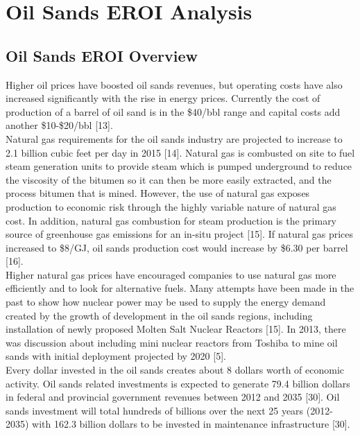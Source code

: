 \documentclass[12pt]{article}
\begin{document}
\section{Oil Sands EROI Analysis}

\subsection{Oil Sands EROI Overview}

Higher oil prices have boosted oil sands revenues, but operating costs have also increased significantly with the rise in energy prices. Currently the cost of production of a barrel of oil sand is in the \$40/bbl range and capital costs add another \$10-\$20/bbl [13].\\

Natural gas requirements for the oil sands industry are projected to increase to 2.1 billion cubic feet per day in 2015 [14]. Natural gas is combusted on site to fuel steam generation units to provide steam which is pumped underground to reduce the viscosity of the bitumen so it can then be more easily extracted, and the process bitumen that is mined. However, the use of natural gas exposes production to economic risk through the highly variable nature of natural gas cost. In addition, natural gas combustion for steam production is the primary source of greenhouse gas emissions for an in-situ project [15]. If natural gas prices increased to \$8/GJ, oil sands production cost would increase by \$6.30 per barrel [16].\\ 

Higher natural gas prices have encouraged companies to use natural gas more efficiently and to look for alternative fuels.  Many attempts have been made in the past to show how nuclear power may be used to supply the energy demand created by the growth of development in the oil sands regions, including installation of newly proposed Molten Salt Nuclear Reactors [15]. In 2013, there was discussion about including mini nuclear reactors from Toshiba to mine oil sands with initial deployment projected by 2020 [5].\\

Every dollar invested in the oil sands creates about 8 dollars worth of economic activity. Oil sands related investments is expected to generate 79.4 billion dollars in federal and provincial government revenues between 2012 and 2035 [30]. Oil sands investment will total hundreds of billions over the next 25 years (2012-2035) with 162.3 billion dollars to be invested in maintenance infrastructure [30]. \\
\end{document}
